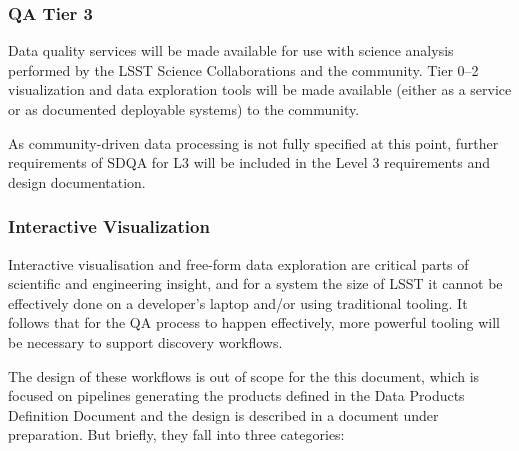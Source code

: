 \subsubsection{QA Tier 3}
\label{sec:qaQA3}

Data quality services will be made available for use with science analysis performed by the LSST Science Collaborations and the community. Tier 0--2 visualization and data exploration tools will be made available (either as a service or as documented deployable systems) to the community.

As community-driven data processing is not fully specified at this point, further requirements of SDQA for L3 will be included in the Level 3 requirements and design documentation.


\subsubsection{Interactive Visualization}
\label{sec:qaInteractiveVis}

Interactive visualisation and free-form data exploration are critical parts of scientific and engineering insight, and for a system the size of LSST it cannot be effectively done on a developer's laptop and/or using traditional tooling. It follows that for the QA process to happen effectively, more powerful tooling will be necessary to support discovery workflows.

The design of these workflows is out of scope for the this document, which is focused on pipelines generating the products defined in the Data Products Definition Document and the design is described in a document under preparation. But briefly, they fall into three categories:

